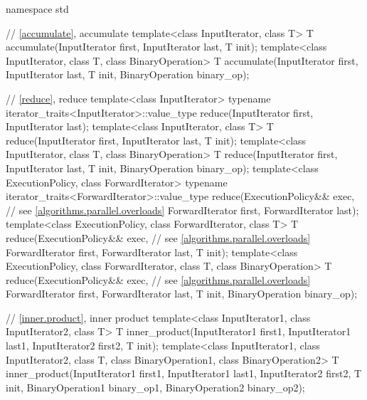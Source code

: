 %
\begin{codeblock}
namespace std {
  // \ref{accumulate}, accumulate
  template<class InputIterator, class T>
    T accumulate(InputIterator first, InputIterator last, T init);
  template<class InputIterator, class T, class BinaryOperation>
    T accumulate(InputIterator first, InputIterator last, T init, BinaryOperation binary_op);

  // \ref{reduce}, reduce
  template<class InputIterator>
    typename iterator_traits<InputIterator>::value_type
      reduce(InputIterator first, InputIterator last);
  template<class InputIterator, class T>
    T reduce(InputIterator first, InputIterator last, T init);
  template<class InputIterator, class T, class BinaryOperation>
    T reduce(InputIterator first, InputIterator last, T init, BinaryOperation binary_op);
  template<class ExecutionPolicy, class ForwardIterator>
    typename iterator_traits<ForwardIterator>::value_type
      reduce(ExecutionPolicy&& exec, // see \ref{algorithms.parallel.overloads}
             ForwardIterator first, ForwardIterator last);
  template<class ExecutionPolicy, class ForwardIterator, class T>
    T reduce(ExecutionPolicy&& exec, // see \ref{algorithms.parallel.overloads}
             ForwardIterator first, ForwardIterator last, T init);
  template<class ExecutionPolicy, class ForwardIterator, class T, class BinaryOperation>
    T reduce(ExecutionPolicy&& exec, // see \ref{algorithms.parallel.overloads}
             ForwardIterator first, ForwardIterator last, T init, BinaryOperation binary_op);

  // \ref{inner.product}, inner product
  template<class InputIterator1, class InputIterator2, class T>
    T inner_product(InputIterator1 first1, InputIterator1 last1,
                    InputIterator2 first2, T init);
  template<class InputIterator1, class InputIterator2, class T,
           class BinaryOperation1, class BinaryOperation2>
    T inner_product(InputIterator1 first1, InputIterator1 last1,
                    InputIterator2 first2, T init,
                    BinaryOperation1 binary_op1,
                    BinaryOperation2 binary_op2);

}
\end{codeblock}
